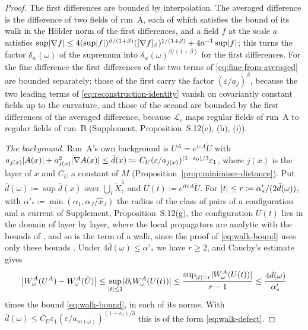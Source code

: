 \documentclass[11pt]{preprint}
\DeclarePairedDelimiter{\abs}{\lvert}{\rvert}
\numberwithin{equation}{section}
\theoremstyle{definition}
\theoremstyle{remark}
\theoremstyle{plain}
\begin{document}
\begin{proof}
The first differences are bounded by interpolation. The averaged difference is the difference of two fields of run~A, each of which satisfies the bound of its walk in the H\"older norm of the first differences, and a field $f$ at the scale $a$ satisfies $\sup\abs{\nabla f} \leq 4(\sup\abs f)^{\beta/(1+\beta)}([\nabla f]_\beta)^{1/(1+\beta)} + 4a^{-1}\sup\abs f$; this turns the factor $\delta_w(\omega)$ of the supremum into $\delta_w(\omega)^{\beta/(1+\beta)}$ for the first differences. For the fine difference the first differences of the two terms of \eqref{eq:fine-from-averaged} are bounded separately: those of the first carry the factor $(\varepsilon/a_j)^\beta$, because the two leading terms of \eqref{eq:reconstruction-identity} vanish on covariantly constant fields up to the curvature, and those of the second are bounded by the first differences of the averaged difference, because $\mathcal L_\iota$ maps regular fields of run~A to regular fields of run~B (Supplement, Proposition~S.12(e), (h), (i)).

\emph{The background.} Run~A's own background is $U^A = e^{i\varepsilon A}\tilde U$ with $a_{j(x)}\abs{A(x)} + a_{j(x)}^2\abs{\nabla A(x)} \leq \bar d(x) \coloneqq C_U(\varepsilon/a_{j(x)})^{(1-\varepsilon_0)/3}\varepsilon_1$, where $j(x)$ is the layer of $x$ and $C_U$ a constant of $M$ (Proposition~\ref{prop:minimiser-distance}). Put $\bar d(\omega) \coloneqq \sup\bar d(x)$ over $\bigcup_i\tilde X_i^5$ and $U(t) \coloneqq e^{it\varepsilon A}\tilde U$. For $\abs{t} \leq r \coloneqq \alpha'_*/(2\bar d(\omega))$, with $\alpha'_* \coloneqq \min(\alpha_1, \alpha_J/\hat x_J)$ the radius of the class of pairs of a configuration and a current of Supplement, Proposition~S.12(g), the configuration $U(t)$ lies in the domain of \cite[(3.37)]{BalabanPBG} layer by layer, where the local propagators are analytic with the bounds of \cite[Theorems~3.1--3.3]{BalabanPBG} \cite[Theorem~3.4, p.~400]{BalabanPBG}, and so is the term of a walk, since the proof of \eqref{eq:walk-bound} uses only these bounds \cite[p.~410]{BalabanPBG}. Under $4\bar d(\omega) \leq \alpha'_*$ we have $r \geq 2$, and Cauchy's estimate gives
\begin{equation}\label{eq:background-change}
    \bigl\lvert W^A_\omega(U^A) - W^A_\omega(\tilde U)\bigr\rvert \leq \sup_{\abs{t} \leq 1}\abs{\partial_tW^A_\omega(U(t))} \leq \frac{\sup_{\abs{t} = r}\abs{W^A_\omega(U(t))}}{r - 1} \leq \frac{4\bar d(\omega)}{\alpha'_*}
\end{equation}
times the bound \eqref{eq:walk-bound}, in each of its norms. With $\bar d(\omega) \leq C_U\varepsilon_1(\varepsilon/a_{m(\omega)})^{(1-\varepsilon_0)/3}$ this is of the form \eqref{eq:walk-defect}.


\end{proof}
\end{document}
